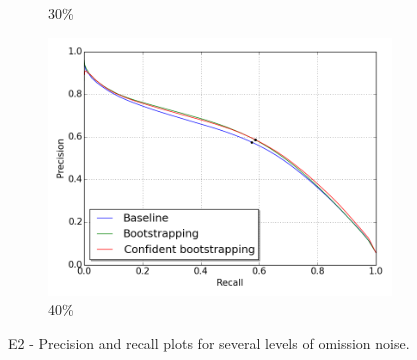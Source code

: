 \begin{figure}[H]
\begin{subfigure}{0.31\textwidth}
\caption{ 30\%} \label{fig:app_E2_3_pr}
\vspace{-0.1cm} %
\end{subfigure}
\hspace*{\fill} %
\begin{subfigure}{0.31\textwidth}
\includegraphics[width=\textwidth]{figs/E2/pr_4.png}
\caption{40\%} \label{fig:app_E2_4_pr}
\vspace{-0.1cm} %
\end{subfigure}
\vspace{-0.6\baselineskip}
\caption[E2 - Precision and recall plots for several levels of omission noise]{E2 - Precision and recall plots for several levels of omission noise.} \label{fig:E2_all_pr}
\end{figure}
\vspace{-0.7cm}
